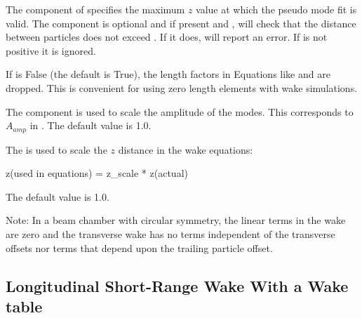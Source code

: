 The  component of  specifies the maximum $z$ value at which the pseudo
mode fit is valid. The  component is optional and if present and , \bmad will
check that the distance between particles does not exceed . If it does, \bmad will report
an error. If  is not positive it is ignored.

If  is False (the default is True), the length factors in Equations like
 and  are dropped. This is convenient for using zero length elements with
wake simulations.

The  component is used to scale the amplitude of the modes. This corresponds to $A_{amp}$
in . The default value is 1.0.

The  is used to scale the $z$ distance in the wake equations:
\begin{example}
  z(used in equations) = z_scale * z(actual)
\end{example}
The default value is 1.0.

Note: In a beam chamber with circular symmetry, the linear terms in the  wake are
zero and the transverse wake has no terms independent of the transverse offsets nor terms that
depend upon the trailing particle offset.

\subsection{Longitudinal Short-Range Wake With a Wake table}
\label{s:sr.wake.z.long}

